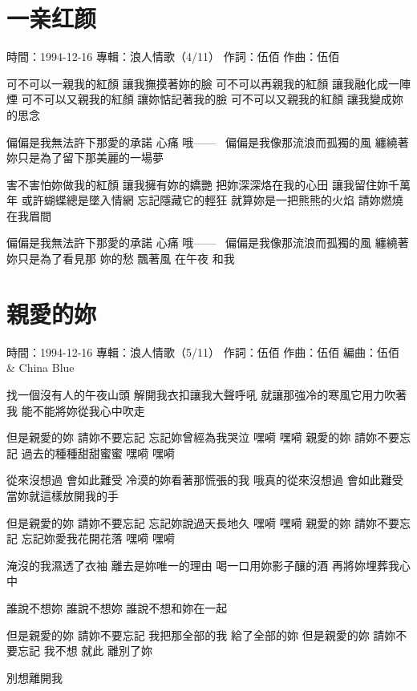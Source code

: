 \documentclass[UTF8,a4paper,oneside,twocolumn,12pt]{ctexbook}
\newcommand{\infopair}[2]{\textbullet #1：#2}
\newcommand{\zc}[1][伍佰]{\infopair{作詞}{#1}}
\newcommand{\zq}[1][伍佰]{\infopair{作曲}{#1}}
\newcommand{\bq}[1][伍佰]{\infopair{編曲}{#1}}
\newcommand{\zj}[1]{\infopair{專輯}{#1}}
\newcommand{\sj}[1]{\infopair{時間}{#1}}
\newenvironment{info}{\begin{flushleft}\kaishu
	}
	{\end{flushleft}\normalsize\yahei\par}
\newenvironment{lyric}{
	}
{}
\begin{document}
\section{一亲红颜}
\begin{info}
	\sj{1994-12-16}
	\zj{浪人情歌（4/11）}
	\zc
	\zq
\end{info}
\begin{lyric}
	可不可以一親我的紅顏 讓我撫摸著妳的臉
	可不可以再親我的紅顏 讓我融化成一陣煙
	可不可以又親我的紅顏 讓妳惦記著我的臉
	可不可以又親我的紅顏 讓我變成妳的思念

	偏偏是我無法許下那愛的承諾 心痛 哦——~
	偏偏是我像那流浪而孤獨的風
	纏繞著妳只是為了留下那美麗的一場夢

	害不害怕妳做我的紅顏 讓我擁有妳的嬌艷
	把妳深深烙在我的心田 讓我留住妳千萬年
	或許蝴蝶總是墜入情網 忘記隱藏它的輕狂
	就算妳是一把熊熊的火焰 請妳燃燒在我眉間

	偏偏是我無法許下那愛的承諾 心痛 哦——~
	偏偏是我像那流浪而孤獨的風
	纏繞著妳只是為了看見那
	妳的愁 飄著風 在午夜 和我
\end{lyric}

\section{親愛的妳}
\begin{info}
	\sj{1994-12-16}
	\zj{浪人情歌（5/11）}
	\zc
	\zq
	\bq[伍佰 \& China Blue]
\end{info}
\begin{lyric}
	找一個沒有人的午夜山頭
	解開我衣扣讓我大聲呼吼
	就讓那強冷的寒風它用力吹著我
	能不能將妳從我心中吹走

	但是親愛的妳 請妳不要忘記
	忘記妳曾經為我哭泣 嘿嗬 嘿嗬
	親愛的妳 請妳不要忘記
	過去的種種甜甜蜜蜜 嘿嗬 嘿嗬

	從來沒想過 會如此難受
	冷漠的妳看著那慌張的我
	哦真的從來沒想過 會如此難受
	當妳就這樣放開我的手

	但是親愛的妳 請妳不要忘記
	忘記妳說過天長地久 嘿嗬 嘿嗬
	親愛的妳 請妳不要忘記
	忘記妳愛我花開花落 嘿嗬 嘿嗬

	淹沒的我濕透了衣袖
	離去是妳唯一的理由
	喝一口用妳影子釀的酒
	再將妳埋葬我心中

	誰說不想妳
	誰說不想妳
	誰說不想和妳在一起

	但是親愛的妳 請妳不要忘記
	我把那全部的我 給了全部的妳
	但是親愛的妳 請妳不要忘記
	我不想 就此 離別了妳

	別想離開我
\end{lyric}
\end{document}
